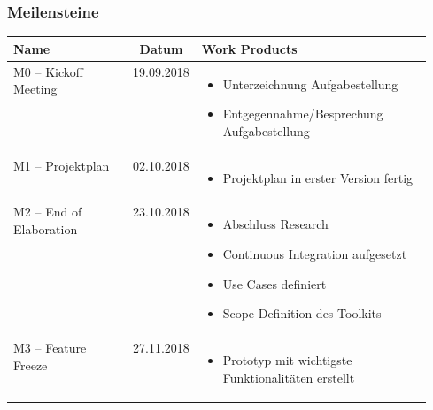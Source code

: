 \subsubsection{Meilensteine}
\begin{table}[H]
    \centering
    \def\arraystretch{2}
    \begin{tabular}{|l|c|p{0.55\linewidth}|} \hline
        \textbf{Name} & \textbf{Datum} & \textbf{Work Products} \\ \hline
        M0 – Kickoff Meeting & 19.09.2018 &
        \vspace{-7mm}
        \begin{itemize}
            \setlength\itemsep{0mm}
            \item Unterzeichnung Aufgabestellung
            \item Entgegennahme/Besprechung Aufgabestellung
            \vspace{-\topsep}
        \end{itemize} \\ \hline
        M1 – Projektplan & 02.10.2018 &
        \vspace{-7mm}
        \begin{itemize}
            \setlength\itemsep{0mm}
            \item Projektplan in erster Version fertig
            \vspace{-\topsep}
        \end{itemize} \\ \hline
        M2 – End of Elaboration & 23.10.2018 &
        \vspace{-7mm}
        \begin{itemize}
            \setlength\itemsep{0mm}
            \item Abschluss Research
            \item Continuous Integration aufgesetzt
            \item Use Cases definiert
            \item Scope Definition des Toolkits
            \vspace{-\topsep}
        \end{itemize} \\ \hline
        M3 – Feature Freeze & 27.11.2018 &
        \vspace{-7mm}
        \begin{itemize}
            \setlength\itemsep{0mm}
            \item Prototyp mit wichtigste Funktionalitäten erstellt
            \vspace{-\topsep}

\end{itemize}
\end{tabular}
\end{table}
